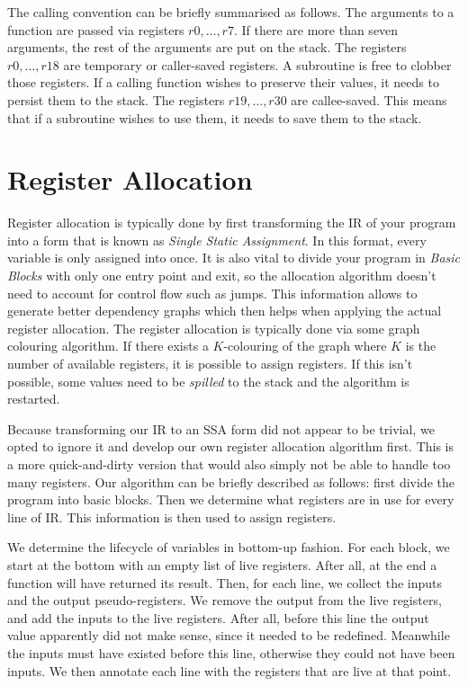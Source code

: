 The calling convention can be briefly summarised as follows.
The arguments to a function are passed via registers $r0, \ldots, r7$.
If there are more than seven arguments, the rest of the arguments are put on the stack.
The registers $r0, \ldots, r18$ are temporary or caller-saved registers.
A subroutine is free to clobber those registers.
If a calling function wishes to preserve their values, it needs to persist them to the stack.
The registers $r19, \ldots, r30$ are callee-saved.
This means that if a subroutine wishes to use them, it needs to save them to the stack.

\section{Register Allocation}

Register allocation is typically done by first transforming the IR of your program into a form that is known as \emph{Single Static Assignment}.
In this format, every variable is only assigned into once.
It is also vital to divide your program in \emph{Basic Blocks} with only one entry point and exit, so the allocation algorithm doesn't need to account for control flow such as jumps.
This information allows to generate better dependency graphs which then helps when applying the actual register allocation.
The register allocation is typically done via some graph colouring algorithm.
If there exists a $K$-colouring of the graph where $K$ is the number of available registers, it is possible to assign registers.
If this isn't possible, some values need to be \emph{spilled} to the stack and the algorithm is restarted.

Because transforming our IR to an SSA form did not appear to be trivial, we opted to ignore it and develop our own register allocation algorithm first.
This is a more quick-and-dirty version that would also simply not be able to handle too many registers.
Our algorithm can be briefly described as follows: first divide the program into basic blocks.
Then we determine what registers are in use for every line of IR\@.
This information is then used to assign registers.

We determine the lifecycle of variables in bottom-up fashion.
For each block, we start at the bottom with an empty list of live registers.
After all, at the end a function will have returned its result.
Then, for each line, we collect the inputs and the output pseudo-registers.
We remove the output from the live registers, and add the inputs to the live registers.
After all, before this line the output value apparently did not make sense, since it needed to be redefined.
Meanwhile the inputs must have existed before this line, otherwise they could not have been inputs.
We then annotate each line with the registers that are live at that point.

